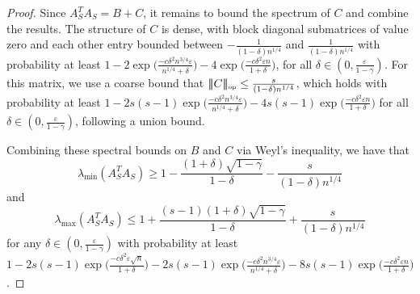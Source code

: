 \documentclass{article} %
\newcommand{\n}{\ensuremath{n}}
\newcommand{\matsnorm}[2]{|\!|\!| #1 | \! | \!|_{{#2}}}
\newcommand{\opnorm}[1]{\ensuremath{\matsnorm{#1}{\tiny{\mbox{op}}}}}
\newcommand{\1}{\ensuremath{{\sf (i)}}}
\newcommand{\2}{\ensuremath{{\sf (ii)}}}
\newcommand{\3}{\ensuremath{{\sf (iii)}}}
\newcommand{\4}{\ensuremath{{\sf (iv)}}}
\newcommand{\5}{\ensuremath{{\sf (v)}}}
\newcommand{\6}{\ensuremath{{\sf (vi)}}}
\begin{document}
\begin{proof}
Since $A_S^TA_S = B + C$, it remains to bound the spectrum of $C$ and combine the results.
The structure of $C$ is dense, with block diagonal submatrices of value zero and each other entry bounded between $-\frac{ 1}{(1-\delta) \n^{1/4}}$ and $\frac{ 1}{(1-\delta) \n^{1/4}}$
with probability at least $1 - 2\exp{\big(\frac{-c\delta^2 \n^{3/4} \varepsilon}{\n^{1/4} +\delta  }\big)} - 4\exp{\big(\frac{-c\delta^2\varepsilon \n}{1+\delta}\big)}$, for all $\delta \in (0, \frac{\varepsilon}{1-\gamma})$.
For this matrix, we use a coarse bound that $\opnorm{C} \leq \frac{ s}{(1-\delta) \n^{1/4}}$, which holds with probability at least $1 - 2s(s-1)\exp{\big(\frac{-c\delta^2 \n^{3/4} \varepsilon}{\n^{1/4} +\delta  }\big)} - 4s(s-1)\exp{\big(\frac{-c\delta^2\varepsilon \n}{1+\delta}\big)}$ for all $\delta \in (0, \frac{\varepsilon}{1-\gamma})$, following a union bound.

Combining these spectral bounds on $B$ and $C$ via Weyl's inequality, we have that
\begin{equation*}
    \lambda_\text{min}(A_S^TA_S) \geq 1 - \frac{(1+\delta)\sqrt{1-\gamma}}{1-\delta} - \frac{ s}{(1-\delta) \n^{1/4}}
\end{equation*}
and 
\begin{equation*}
    \lambda_\text{max}(A_S^TA_S) \leq 1 + \frac{(s-1)(1+\delta)\sqrt{1-\gamma}}{1-\delta} + \frac{ s}{(1-\delta) \n^{1/4}}
\end{equation*}
for any $\delta \in (0, \frac{\varepsilon}{1-\gamma})$ with probability at least $1 - 2s(s-1)\exp{\big(\frac{-c\delta^2\varepsilon\sqrt{\n}}{1+\delta}\big)} - 2s(s-1)\exp{\big(\frac{-c\delta^2 \n^{3/4} \varepsilon}{\n^{1/4} +\delta  }\big)} - 8s(s-1)\exp{\big(\frac{-c\delta^2\varepsilon \n}{1+\delta}\big)}$. 
\end{proof}
\end{document}
